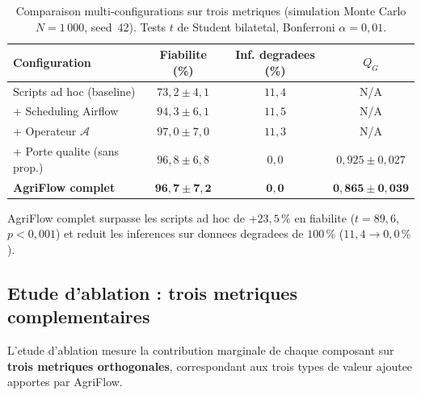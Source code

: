 \documentclass[12pt,a4paper]{article}
\theoremstyle{plain}
\theoremstyle{definition}
\theoremstyle{remark}
\begin{document}
	\begin{table}[H]
		\caption{Comparaison multi-configurations sur trois metriques
			(simulation Monte Carlo $N=1\,000$, seed~42).
			Tests $t$ de Student bilatetal, Bonferroni $\alpha=0{,}01$.}
		\label{tab:multisystem}
		\centering\small
		\renewcommand{\arraystretch}{1.38}
		\begin{tabularx}{\linewidth}{Xccc}
			\toprule
			\textbf{Configuration} & \textbf{Fiabilite (\%)} &
			\textbf{Inf. degradees (\%)} & \textbf{$Q_G$} \\
			\midrule
			\rowcolor{lightblue!30}
			Scripts ad hoc (baseline) & $73{,}2 \pm 4{,}1$ & $11{,}4$ & N/A \\
			+ Scheduling Airflow & $94{,}3 \pm 6{,}1$ & $11{,}5$ & N/A \\
			\rowcolor{lightblue!30}
			+ Operateur $\mathcal{A}$ & $97{,}0 \pm 7{,}0$ & $11{,}3$ & N/A \\
			+ Porte qualite (sans prop.) & $96{,}8 \pm 6{,}8$ & $0{,}0$ & $0{,}925 \pm 0{,}027$ \\
			\rowcolor{lightgreen!50}
			\textbf{AgriFlow complet} & $\mathbf{96{,}7 \pm 7{,}2}$ & $\mathbf{0{,}0}$ & $\mathbf{0{,}865 \pm 0{,}039}$ \\
			\bottomrule
		\end{tabularx}
	\end{table}
	
	AgriFlow complet surpasse les scripts ad hoc de $+23{,}5\,\%$ en
	fiabilite ($t=89{,}6$, $p<0{,}001$) et reduit les inferences sur
	donnees degradees de $100\,\%$ ($11{,}4 \to 0{,}0\,\%$).
	
	\subsection{Etude d'ablation : trois metriques complementaires}
	\label{subsec:ablation}
	
	L'etude d'ablation mesure la contribution marginale de chaque composant
	sur \textbf{trois metriques orthogonales}, correspondant aux trois types de
	valeur ajoutee apportes par AgriFlow.
	
\end{document}
